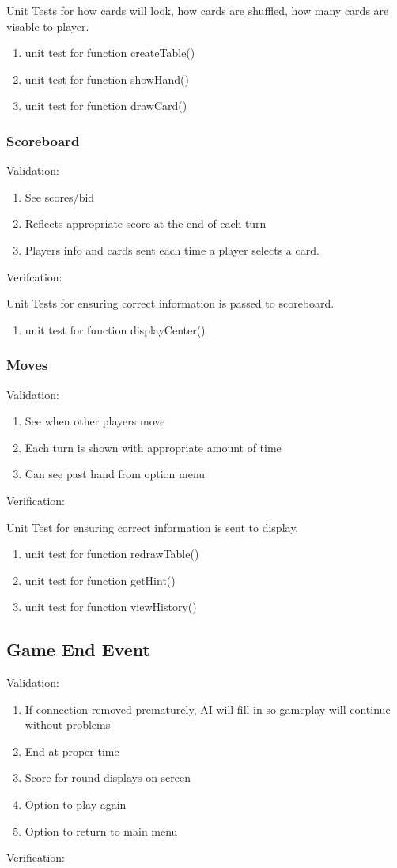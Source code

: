 \documentclass[11pt, titlepage]{article}
\begin{document}
			Unit Tests for how cards will look, how cards are shuffled, how many cards are visable to player.
			\begin{enumerate}
				\item unit test for function createTable()		
				\item unit test for function showHand()
				\item unit test for function drawCard()	
			\end{enumerate}
			\subsubsection{Scoreboard}
			Validation:
			\begin{enumerate}
				\item See scores/bid
				\item Reflects appropriate score at the end of each turn
				\item Players info and cards sent each time a player selects a card.
			\end{enumerate}
			Verifcation:
			
			Unit Tests for ensuring correct information is passed to scoreboard.
			\begin{enumerate}
				\item unit test for function displayCenter()			
			\end{enumerate}
	
			\subsubsection{Moves}
			Validation:
			\begin{enumerate}
				\item  See when other players move
				\item  Each turn is shown with appropriate amount of time
				\item  Can see past hand from option menu
			\end{enumerate}
			Verification:
		
			Unit Test for ensuring correct information is sent to display.
			\begin{enumerate}
				\item unit test for function redrawTable()
				\item unit test for function getHint()
				\item unit test for function viewHistory()			
			\end{enumerate}
		\subsection{Game End Event}
			Validation:
			\begin{enumerate}
				\item If connection removed prematurely, AI will fill in so gameplay will continue without problems
				\item End at proper time
				\item Score for round displays on screen
				\item Option to play again
				\item Option to return to main menu
			\end{enumerate}
			Verification:
			
\end{document}
